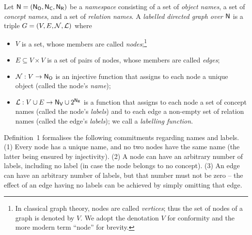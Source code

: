 \begin{definition}
  \label{def:ld_graph}
  Let $\textup{\textsf{N}}=(\mathsf{N}_\mathsf{O},\mathsf{N}_\mathsf{C},\mathsf{N}_\mathsf{R})$ be a \emph{namespace} consisting of a set \NO of \emph{object names}, a set \NC of \emph{concept names}, and a set \NR of \emph{relation names}.
  A \emph{labelled directed graph over $\textup{\textsf{N}}$} is a triple $G = (V,E,\mathcal{N},\mathcal{L})$
  where
  \begin{itemize}
    \item
      $V$ is a set, whose members are called \emph{nodes};\footnote{%
        In classical graph theory, nodes are called \emph{vertices}; thus the set of
        nodes of a graph is denoted by $V$. We adopt the denotation $V$ for conformity
        and the more modern term \enquote{node} for brevity.%
      }      
    \item 
      $E \subseteq V \times V$ is a set of pairs of nodes, whose members are called \emph{edges};
    \item
      $\mathcal{N} : V \to \mathsf{N}_\mathsf{O}$ is an injective function that assigns
      to each node a unique object (called the node's \emph{name});
    \item
      $\mathcal{L} : V \cup E \to \mathsf{N}_\mathsf{V} \cup 2^{\mathsf{N}_\mathsf{R}}$ is a function that assigns 
      to each node a set of concept names (called the node's \emph{labels}) and
      to each edge a non-empty set of relation names (called the edge's \emph{labels});
      we call \Lmc a \emph{labelling function}.
  \end{itemize}
\end{definition}
%
Definition~1 formalises the following commitments regarding names and labels.
%
(1) Every node has a unique name, and no two nodes have the same name (the latter being ensured by injectivity).
(2) A node can have an arbitrary number of labels, including no label (in case the node belongs to no concept).
(3) An edge can have an arbitrary number of labels, but that number must not be zero --
the effect of an edge having no labels can be achieved by simply omitting that edge.

